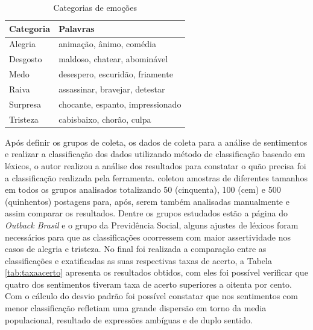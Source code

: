 \begin{table}[h!]
  \begin{center}
    \caption{Categorias de emoções}
    \label{tab:categoriaemo}
    \begin{tabular}{ll} %
      \textbf{Categoria} & \textbf{Palavras}\\
      \hline
      Alegria&animação, ânimo, comédia\\
      Desgosto&maldoso, chatear, abominável\\
      Medo&desespero, escuridão, friamente\\
      Raiva&assassinar, bravejar, detestar\\
      Surpresa&chocante, espanto, impressionado\\
      Tristeza&cabisbaixo, chorão, culpa\\
      \hline
    \end{tabular}
  \end{center}
\end{table}
Após definir os grupos de coleta, os dados de coleta para a análise de sentimentos e realizar a classificação dos dados utilizando método de classificação baseado em léxicos, o autor realizou a análise dos resultados para constatar o quão precisa foi a classificação realizada pela ferramenta. \citeauthor{tccfilipe} coletou amostras de diferentes tamanhos em todos os grupos analisados totalizando 50 (cinquenta), 100 (cem) e 500 (quinhentos) postagens para, após, serem também analisadas manualmente e assim comparar os resultados. Dentre os grupos estudados estão a página do \textit{Outback Brasil} e o grupo da Previdência Social, alguns ajustes de léxicos foram necessários para que as classificações ocorressem com maior assertividade nos casos de alegria e tristeza. No final foi realizada a comparação entre as classificações e exatificadas as suas respectivas taxas de acerto, a Tabela \ref{tab:taxaacerto} apresenta os resultados obtidos, com eles foi possível verificar que quatro dos sentimentos tiveram taxa de acerto superiores a oitenta por cento. Com o cálculo do desvio padrão foi possível constatar que nos sentimentos com menor classificação refletiam uma grande dispersão em torno da media populacional, resultado de expressões ambíguas e de duplo sentido.

